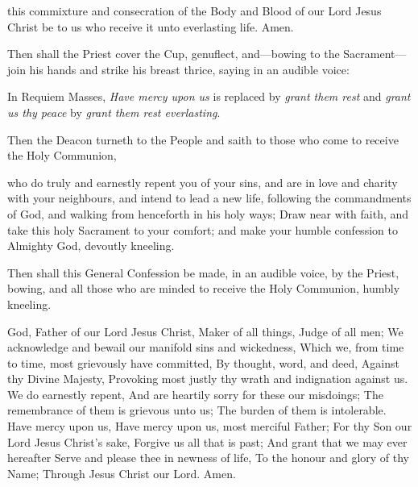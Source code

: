  this commixture and consecration of the Body and Blood of our Lord Jesus Christ be to us who receive it unto everlasting life. Amen.
\begin{rubric}
    Then shall the Priest cover the Cup, genuflect, and---bowing to the Sacrament---join his hands and strike his breast thrice, saying in an audible voice:
\end{rubric}
\begin{rubric}
	In Requiem Masses, \emph{Have mercy upon us} is replaced by \emph{grant them rest} and \emph{grant us thy peace} by \emph{grant them rest everlasting}.
\end{rubric}
\begin{rubric}
    Then the Deacon turneth to the People and saith to those who come to receive the Holy Communion,
\end{rubric}
 who do truly and earnestly repent you of your sins, and are in love and charity with your neighbours, and intend to lead a new life, following the commandments of God, and walking from henceforth in his holy ways; Draw near with faith, and take this holy Sacrament to your comfort; and make your humble confession to Almighty God, devoutly kneeling.
\begin{rubric}
Then shall this General Confession be made, in an audible voice, by the Priest, bowing, and all those who are minded to receive the Holy Communion, humbly kneeling.
\end{rubric}
 God, Father of our Lord Jesus Christ, Maker of all things, Judge of all men; We acknowledge and bewail our manifold sins and wickedness, Which we, from time to time, most grievously have committed, By thought, word, and deed, Against thy Divine Majesty, Provoking most justly thy wrath and indignation against us. We do earnestly repent, And are heartily sorry for these our misdoings; The remembrance of them is grievous unto us; The burden of them is intolerable. Have mercy upon us, Have mercy upon us, most merciful Father; For thy Son our Lord Jesus Christ's sake, Forgive us all that is past; And grant that we may ever hereafter Serve and please thee in newness of life, To the honour and glory of thy Name; Through Jesus Christ our Lord. Amen.

